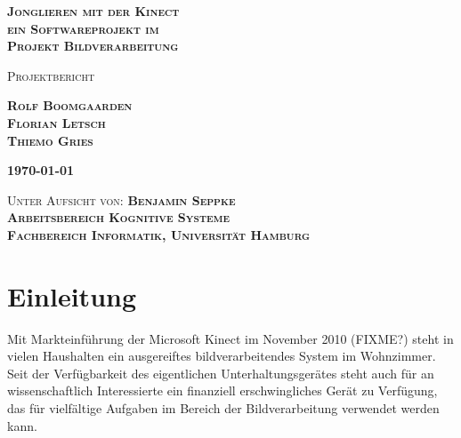 \documentclass[12pt,a4paper,ngerman]{scrartcl}
\begin{document}
\begin{titlepage}

\vspace*{3 cm}

\begin{flushright}

\bfseries{\Huge\scshape Jonglieren mit der Kinect\\{\Large ein Softwareprojekt im}\\Projekt Bildverarbeitung}
\end{flushright}

\vspace{2 cm}

\begin{flushright}
\scshape{\large Projektbericht}
\end{flushright}

\begin{flushright}
\scshape{\LARGE\bfseries Rolf Boomgaarden\\}
\scshape{\LARGE\bfseries Florian Letsch\\}
\scshape{\LARGE\bfseries Thiemo Gries\\}
\end{flushright}

\vspace{2 cm}

\begin{flushright}
\scshape{\large\bfseries \today}
\end{flushright}

\vfill

\begin{flushright}

\scshape{Unter Aufsicht von: {\bfseries Benjamin Seppke}\\}
\scshape{\bfseries Arbeitsbereich Kognitive Systeme\\}
\scshape{\bfseries Fachbereich Informatik, Universität Hamburg\\}
\end{flushright}

\end{titlepage}

\tableofcontents
\newpage

\section{Einleitung}

Mit Markteinführung der Microsoft Kinect im November 2010 (FIXME?) steht in vielen
Haushalten ein ausgereiftes bildverarbeitendes System im Wohnzimmer. Seit der
Verfügbarkeit des eigentlichen Unterhaltungsgerätes steht auch für an
wissenschaftlich Interessierte ein finanziell erschwingliches Gerät zu Verfügung,
das für vielfältige Aufgaben im Bereich der Bildverarbeitung verwendet werden kann.
\end{document}
